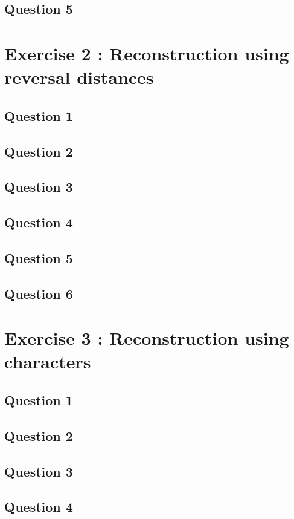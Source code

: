 \documentclass[]{article}
\begin{document}
\subsection{Question 5}



\section{Exercise 2 : Reconstruction using reversal distances}
\subsection{Question 1}
\subsection{Question 2}
\subsection{Question 3}
\subsection{Question 4}
\subsection{Question 5}
\subsection{Question 6}
\section{Exercise 3 : Reconstruction using characters}
\subsection{Question 1}
\subsection{Question 2}
\subsection{Question 3}
\subsection{Question 4}
\end{document}

